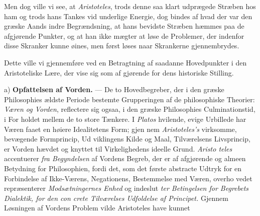 Men dog ville vi see, at \emph{Aristoteles}, trods denne saa
klart udprægede Stræben hos ham og trods hans Tankes vid\-%
underlige Energie, dog bindes af hvad der var den græske
Aands indre Begrændsning, at hans bevidste Stræben hæmmes
paa de afgjørende Punkter, og at han ikke mægter at løse de
Problemer, der indenfor disse Skranker kunne øines, men først
løses naar Skrankerne gjennembrydes.

Dette ville vi gjennemføre ved en Betragtning af saadanne
Hovedpunkter i den Aristoteliske Lære, der vise sig som af\-%
gjørende for dens historiske Stilling.

a) \textbf{Opfattelsen af Vorden.} --- De to Hovedbegreber, der i
den græske Philosophies ældste Periode bestemte Grupperingen
af de philosophiske Theorier: \emph{Væren og Vorden}, reflectere
sig ogsaa, i den græske Philosophies Culminationstid, i For\-%
holdet mellem de to store Tænkere. I \emph{Platos} hvilende, evige
Urbillede har Væren faaet en høiere Idealitetens Form; gjen\-%
nem \emph{Aristoteles's} virksomme, bevægende Formprincip, Ud\-%
viklingens Kilde og Maal, Tilværelsens Livsprincip, er Vorden
hævdet og knyttet til Virkelighedens ideelle Grund. \emph{Aristo\-%
teles} accentuerer \emph{fra Begyndelsen} af Vordens Begreb, der
er af afgjørende og almeen Betydning for Philosophien, fordi
det, som det første abstracte Udtryk for en Forbindelse af
Ikke-Værens, Negationens, Bestemmelse med Væren, overho\-%
vedet repræsenterer \emph{Modsætningernes Enhed} og indeslut\-%
\emph{ter Betingelsen for Begrebets Dialektik, for den con\-%
crete Tilværelses Udfoldelse af Principet.} Gjennem
Løsningen af Vordens Problem vilde Aristoteles have kunnet
